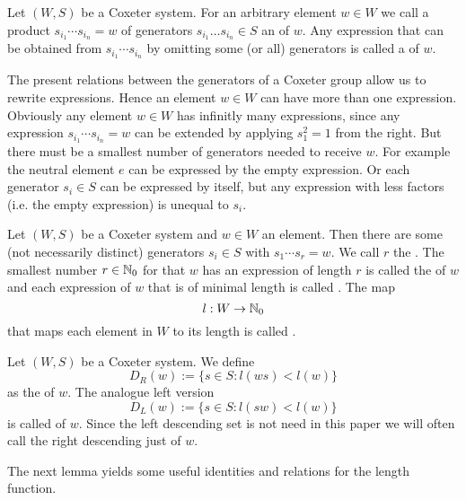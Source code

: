 \begin{defi}
	Let $(W,S)$ be a Coxeter system. For an arbitrary element $w \in W$ we call a product $s_{i_1} \cdots s_{i_n} = w$ of generators $s_{i_1} \ldots s_{i_n} \in S$ an  of $w$. Any expression that can be obtained from $s_{i_1} \cdots s_{i_n}$ by omitting some (or all) generators is called a  of $w$.
\end{defi}

The present relations between the generators of a Coxeter group allow us to rewrite expressions. Hence an element $w \in W$ can have more than one expression. Obviously any element $w \in W$ has infinitly many expressions, since any expression $s_{i_1} \cdots s_{i_n} = w$ can be extended by applying $s_1^2 = 1$ from the right. But there must be a smallest number of generators needed to receive $w$. For example the neutral element $e$ can be expressed by the empty expression. Or each generator $s_i \in S$ can be expressed by itself, but any expression with less factors (i.e. the empty expression) is unequal to $s_i$.

\begin{defi}
	Let $(W,S)$ be a Coxeter system and $w \in W$ an element. Then there are some (not necessarily distinct) generators $s_i \in S$ with $s_1 \cdots s_r = w$. We call $r$ the . The smallest number $r \in \mathbb{N}_0$ for that $w$ has an expression of length $r$ is called the  of $w$ and each expression of $w$ that is of minimal length is called . The map
	$$ l : W \to \mathbb{N}_0 $$
	that maps each element in $W$ to its length is called .
\end{defi}

\begin{defi}
	Let $(W,S)$ be a Coxeter system. We define
	$$ D_R(w) := \{ s \in S : l(ws) < l(w) \} $$
	as the  of $w$. The analogue left version
	$$ D_L(w) := \{ s \in S : l(sw) < l(w) \} $$
	is called  of $w$. Since the left descending set is not need in this paper we will often call the right descending just  of $w$.
\end{defi}

The next lemma yields some useful identities and relations for the length function.


